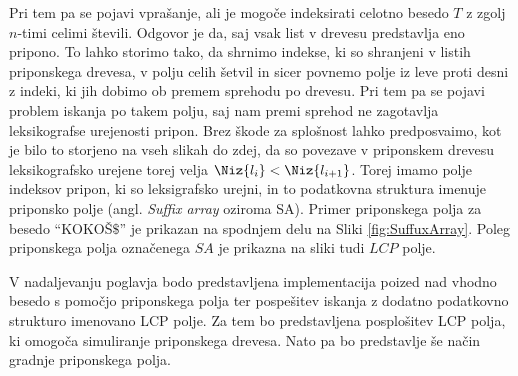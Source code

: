 Pri tem pa se pojavi vprašanje, ali je mogoče indeksirati celotno besedo $T$ z zgolj $n$-timi celimi števili. Odgovor je da, saj vsak list v drevesu predstavlja eno pripono. To lahko storimo tako, da shrnimo indekse, ki so shranjeni v listih priponskega drevesa, v polju celih šetvil in sicer povnemo polje iz leve proti desni z indeki, ki jih dobimo ob premem sprehodu po drevesu. Pri tem pa se pojavi problem iskanja po takem polju, saj nam premi sprehod ne zagotavlja leksikografse urejenosti pripon. Brez škode za splošnost lahko predposvaimo, kot je bilo to storjeno na vseh slikah do zdej, da so povezave v priponskem drevesu leksikografsko urejene torej velja $\Niz{l_i}<\Niz{l_{i+1}}$. Torej imamo polje indeksov pripon, ki so leksigrafsko urejni, in to podatkovna struktura imenuje priponsko polje (angl. \textit{Suffix array} oziroma SA). Primer priponskega polja za besedo \enquote{KOKOŠ$\$$} je prikazan na spodnjem delu na Sliki \ref{fig:SuffuxArray}. Poleg priponskega polja označenega $SA$ je prikazna na sliki tudi $LCP$ polje.



V nadaljevanju poglavja bodo predstavljena implementacija poized nad vhodno besedo s pomočjo priponskega polja ter pospešitev iskanja z dodatno podatkovno strukturo imenovano LCP polje. Za tem bo predstavljena posplošitev LCP polja, ki omogoča simuliranje priponskega drevesa. Nato pa bo predstavlje še način gradnje priponskega polja.





